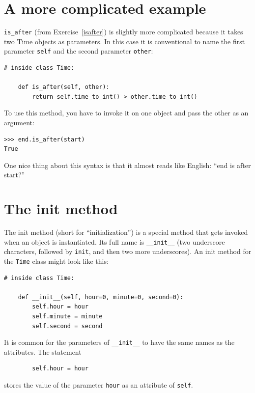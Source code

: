 \documentclass[10pt]{book}
\begin{document}
\section{A more complicated example}

\verb"is_after" (from Exercise~\ref{isafter}) is slightly more complicated
because it takes two Time objects as parameters.  In this case it is
conventional to name the first parameter {\tt self} and the second
parameter {\tt other}:

\begin{verbatim}
# inside class Time:

    def is_after(self, other):
        return self.time_to_int() > other.time_to_int()
\end{verbatim}
%
To use this method, you have to invoke it on one object and pass
the other as an argument:

\begin{verbatim}
>>> end.is_after(start)
True
\end{verbatim}
%
One nice thing about this syntax is that it almost reads
like English: ``end is after start?''


\section{The init method}

The init method (short for ``initialization'') is
a special method that gets invoked when an object is instantiated.
Its full name is \verb"__init__" (two underscore characters,
followed by {\tt init}, and then two more underscores).  An
init method for the {\tt Time} class might look like this:

\begin{verbatim}
# inside class Time:

    def __init__(self, hour=0, minute=0, second=0):
        self.hour = hour
        self.minute = minute
        self.second = second
\end{verbatim}
%
It is common for the parameters of \verb"__init__"
to have the same names as the attributes.  The statement

\begin{verbatim}
        self.hour = hour
\end{verbatim}
%
stores the value of the parameter {\tt hour} as an attribute
of {\tt self}.
\end{document}
